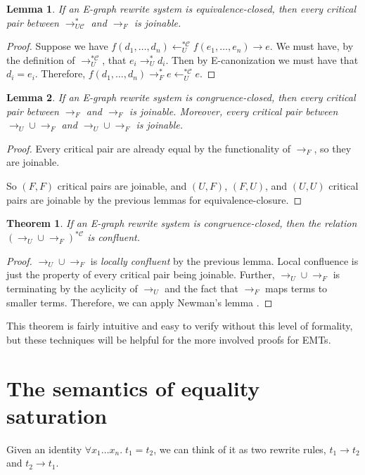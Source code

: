 \documentclass[12pt,a4paper,twoside,openright]{report}
\numberwithin{equation}{chapter}		%
\numberwithin{figure}{chapter}			%
\numberwithin{table}{chapter}			%
\theoremstyle{definition}
\theoremstyle{plain}
\newtheorem{lemma}{Lemma}
\newtheorem{theorem}{Theorem}
\begin{document}
\begin{lemma}
If an E-graph rewrite system is equivalence-closed, then every critical pair between $\rightarrow^*_{U \mathcal{C}}$ and $\rightarrow_F$ is joinable.
\end{lemma}
\begin{proof}
Suppose we have $f(d_1, \ldots, d_n) \leftarrow^{*\mathcal{C}}_U f(e_1, \ldots, e_n) \rightarrow e$. We must have, by the definition of $\rightarrow^{*\mathcal{C}}_U$, that $e_i \rightarrow^*_U d_i$. Then by E-canonization we must have that $d_i = e_i$. Therefore, $f(d_1, \ldots, d_n) \rightarrow^*_F e \leftarrow^{*\mathcal{C}}_U e$.
\end{proof}

\begin{lemma}
If an E-graph rewrite system is congruence-closed, then every critical pair between $\rightarrow_F$ and $\rightarrow_F$ is joinable. Moreover, every critical pair between $\rightarrow_U \cup \rightarrow_F$ and $\rightarrow_U \cup \rightarrow_F$ is joinable.
\end{lemma}
\begin{proof}
Every critical pair are already equal by the functionality of $\rightarrow_F$, so they are joinable.

So $(F,F)$ critical pairs are joinable, and $(U,F)$, $(F, U)$, and $(U, U)$ critical pairs are joinable by the previous lemmas for equivalence-closure.
\end{proof}

\begin{theorem}
If an E-graph rewrite system is congruence-closed, then the relation $(\rightarrow_U \cup \rightarrow_F)^{*\mathcal{C}}$ is confluent.
\end{theorem}
\begin{proof}
$\rightarrow_U \cup \rightarrow_F$ is \emph{locally confluent} by the previous lemma. Local confluence is just the property of every critical pair being joinable. Further, $\rightarrow_U \cup \rightarrow_F$ is terminating by the acylicity of $\rightarrow_U$ and the fact that $\rightarrow_F$ maps terms to smaller terms. Therefore, we can apply Newman's lemma \cite[Section~2.7]{baader_term_1998}.
\end{proof}

This theorem is fairly intuitive and easy to verify without this level of formality, but these techniques will be helpful for the more involved proofs for EMTs.

\section{The semantics of equality saturation}
Given an identity $\forall x_1 \ldots x_n.\; t_1 = t_2$, we can think of it as two rewrite rules, $t_1 \rightarrow t_2$ and $t_2 \rightarrow t_1$.
\end{document}
